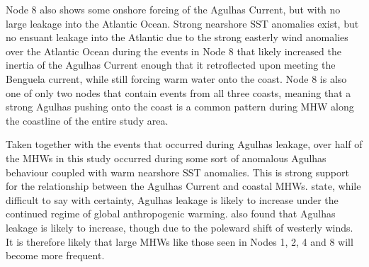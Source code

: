 \documentclass[utf8]{frontiersSCNS}
\begin{document}
Node 8 also shows some onshore forcing of the Agulhas Current, but with no large leakage into the Atlantic Ocean. Strong nearshore SST anomalies exist, but no ensuant leakage into the Atlantic due to the strong easterly wind anomalies over the Atlantic Ocean during the events in Node 8 that likely increased the inertia of the Agulhas Current enough that it retroflected upon meeting the Benguela current, while still forcing warm water onto the coast. Node 8 is also one of only two nodes that contain events from all three coasts, meaning that a strong Agulhas pushing onto the coast is a common pattern during MHW along the coastline of the entire study area.

Taken together with the events that occurred during Agulhas leakage, over half of the MHWs in this study occurred during some sort of anomalous Agulhas behaviour coupled with warm nearshore SST anomalies. This is strong support for the relationship between the Agulhas Current and coastal MHWs. \citet{Beal2011} state, while difficult to say with certainty, Agulhas leakage is likely to increase under the continued regime of global anthropogenic warming. \citet{Biastoch2009} also found that Agulhas leakage is likely to increase, though due to the poleward shift of westerly winds. It is therefore likely that large MHWs like those seen in Nodes 1, 2, 4 and 8 will become more frequent.
\end{document}
